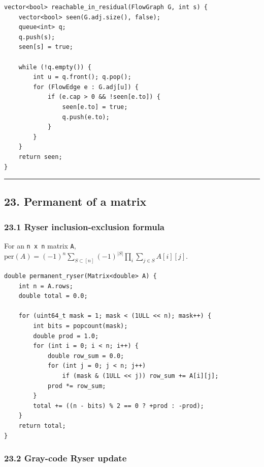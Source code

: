 \documentclass[11pt]{article}
\begin{document}
\begin{verbatim}
vector<bool> reachable_in_residual(FlowGraph G, int s) {
    vector<bool> seen(G.adj.size(), false);
    queue<int> q;
    q.push(s);
    seen[s] = true;

    while (!q.empty()) {
        int u = q.front(); q.pop();
        for (FlowEdge e : G.adj[u]) {
            if (e.cap > 0 && !seen[e.to]) {
                seen[e.to] = true;
                q.push(e.to);
            }
        }
    }
    return seen;
}
\end{verbatim}

\begin{center}\rule{0.5\linewidth}{0.5pt}\end{center}

\subsection{23. Permanent of a matrix}\label{permanent-of-a-matrix}

\subsubsection{23.1 Ryser inclusion-exclusion formula}\label{ryser-inclusion-exclusion-formula}

For an \texttt{n x n} matrix \texttt{A}, \(\mathrm{per}(A)=(-1)^n \sum_{S \subset [n]} (-1)^{|S|} \prod_i \sum_{j \in S} A[i][j]\).

\begin{verbatim}
double permanent_ryser(Matrix<double> A) {
    int n = A.rows;
    double total = 0.0;

    for (uint64_t mask = 1; mask < (1ULL << n); mask++) {
        int bits = popcount(mask);
        double prod = 1.0;
        for (int i = 0; i < n; i++) {
            double row_sum = 0.0;
            for (int j = 0; j < n; j++)
                if (mask & (1ULL << j)) row_sum += A[i][j];
            prod *= row_sum;
        }
        total += ((n - bits) % 2 == 0 ? +prod : -prod);
    }
    return total;
}
\end{verbatim}

\subsubsection{23.2 Gray-code Ryser update}\label{gray-code-ryser-update}
\end{document}
